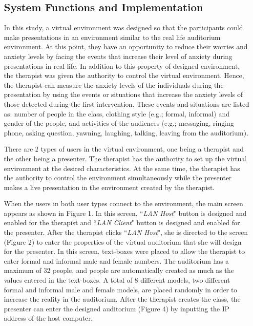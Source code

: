\documentclass{llncs}
\begin{document}
\subsection{System Functions and Implementation}

In this study, a virtual environment was designed so that the participants could make presentations in an environment similar to the real life auditorium environment. At this point, they have an opportunity to reduce their worries and anxiety levels by facing the events that increase their level of anxiety during presentations in real life. In addition to this property of designed environment, the therapist was given the authority to control the virtual environment. Hence, the therapist can measure the anxiety levels of the individuals during the presentation by using the events or situations that increase the anxiety levels of those detected during the first intervention. These events and situations are listed as: number of people in the class, clothing style (e.g.; formal, informal) and gender of the people, and activities of the audiences (e.g.; messaging, ringing phone, asking question, yawning, laughing, talking, leaving from the auditorium).

There are 2 types of users in the virtual environment, one being a therapist and the other being a presenter. The therapist has the authority to set up the virtual environment at the desired characteristics. At the same time, the therapist has the authority to control the environment simultaneously while the presenter makes a live presentation in the environment created by the therapist. 

When the users in both user types connect to the environment, the main screen appears as shown in Figure 1. In this screen, ``\emph{LAN Host}" button is designed and enabled for the therapist and ``\emph{LAN Client}" button is designed and enabled for the presenter. After the therapist clicks ``\emph{LAN Host}", she is directed to the screen (Figure 2) to enter the properties of the virtual auditorium that she will design for the presenter. In this screen, text-boxes were placed to allow the therapist to enter formal and informal male and female numbers. The auditorium has a maximum of 32 people, and people are automatically created as much as the values entered in the text-boxes. A total of 8 different models, two different formal and informal male and female models, are placed randomly in order to increase the reality in the auditorium. After the therapist creates the class, the presenter can enter the designed auditorium (Figure 4) by inputting the IP address of the host computer.
\newpage
\end{document}
